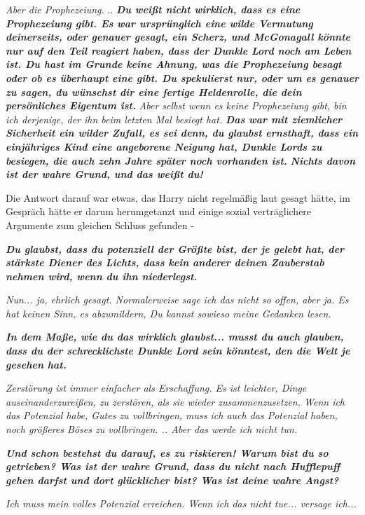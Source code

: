 \emph{ Aber die Prophezeiung.} .. \textbf{\emph{ \glqq Du weißt nicht wirklich,
dass es eine Prophezeiung gibt. Es war ursprünglich eine wilde Vermutung
deinerseits, oder genauer gesagt, ein Scherz, und McGonagall könnte nur auf den
Teil reagiert haben, dass der Dunkle Lord noch am Leben ist. Du hast im Grunde
keine Ahnung, was die Prophezeiung besagt oder ob es überhaupt eine gibt. Du
spekulierst nur, oder um es genauer zu sagen, du wünschst dir eine fertige
Heldenrolle, die dein persönliches Eigentum ist.\grqq{} }} \emph{ Aber selbst
wenn es keine Prophezeiung gibt, bin ich derjenige, der ihn beim letzten Mal
besiegt hat. } \textbf{\emph{ \glqq Das war mit ziemlicher Sicherheit ein wilder
Zufall, es sei denn, du glaubst ernsthaft, dass ein einjähriges Kind eine
angeborene Neigung hat, Dunkle Lords zu besiegen, die auch zehn Jahre später
noch vorhanden ist. }}\textbf{\emph{ Nichts davon ist der wahre Grund, und das
weißt du!\grqq{} }}

Die Antwort darauf war etwas, das Harry nicht regelmäßig laut gesagt hätte, im
Gespräch hätte er darum herumgetanzt und einige sozial verträglichere Argumente
zum gleichen Schluss gefunden -

\textbf{\emph{ \glqq Du glaubst, dass du potenziell der Größte bist, der je
gelebt hat, der stärkste Diener des Lichts, dass kein anderer deinen Zauberstab
nehmen wird, wenn du ihn niederlegst.\grqq{} }}

\emph{ Nun... ja, ehrlich gesagt. Normalerweise sage ich das nicht so offen,
aber ja. Es hat keinen Sinn, es abzumildern, Du kannst sowieso meine Gedanken
lesen.}

\textbf{\emph{ \glqq In dem Maße, wie du das wirklich glaubst... musst du auch
glauben, dass du der schrecklichste Dunkle Lord sein könntest, den die Welt je
gesehen hat.\grqq{} }}

\emph{ Zerstörung ist immer einfacher als Erschaffung. Es ist leichter, Dinge
auseinanderzureißen, zu zerstören, als sie wieder zusammenzusetzen. Wenn ich das
Potenzial habe, Gutes zu vollbringen, muss ich auch das Potenzial haben, noch
größeres Böses zu vollbringen. .. Aber das werde ich nicht tun.}

\textbf{\emph{ \glqq Und schon bestehst du darauf, es zu riskieren! Warum bist
du so getrieben? Was ist der wahre Grund, dass du nicht nach Hufflepuff gehen
darfst und dort glücklicher bist? Was ist deine wahre Angst?\grqq{} }}

\emph{ Ich muss mein volles Potenzial erreichen. Wenn ich das nicht tue...
versage ich...}

